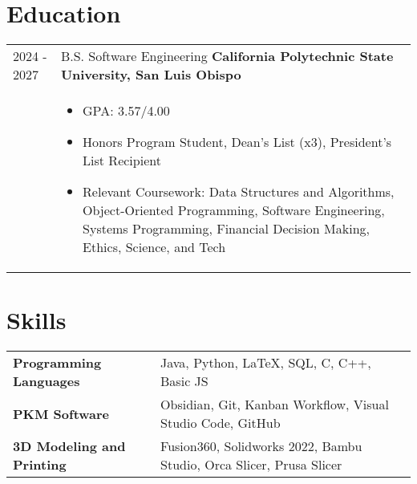 \documentclass[a4paper,12pt]{article}
\begin{document}
\section{Education}
\begin{tabularx}{\linewidth}{@{}l X@{}}	
2024 - 2027 & B.S. Software Engineering \textbf{California Polytechnic State University, San Luis Obispo} \\
& \begin{itemize}[leftmargin=*, nosep]
    \item GPA: 3.57/4.00
    \item Honors Program Student, Dean's List (x3), President's List Recipient
    \item Relevant Coursework: Data Structures and Algorithms, Object-Oriented Programming, Software Engineering, Systems Programming, Financial Decision Making, Ethics, Science, and Tech
  \end{itemize}
\end{tabularx}

\section{Skills}
\begin{tabularx}{\linewidth}{@{}l X@{}}
\textbf{Programming Languages} &  \normalsize{Java, Python, LaTeX, SQL, C, C++, Basic JS}\\
\textbf{PKM Software}  &  \normalsize{Obsidian, Git, Kanban Workflow, Visual Studio Code, GitHub}\\  
\textbf{3D Modeling and Printing}  &  \normalsize{Fusion360, Solidworks 2022, Bambu Studio, Orca Slicer, Prusa Slicer}\\
\end{tabularx}

\vfill
{}
\end{document}
